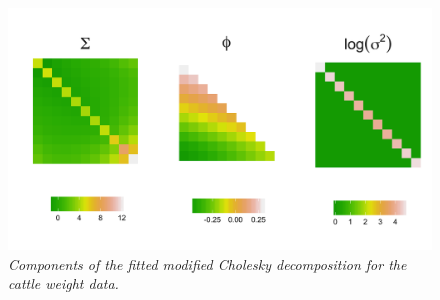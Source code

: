 %

\begin{figure}[H]
  \centering
  \includegraphics[width = \textwidth]{img/chapter-5/cattle-cholesky-estimate-ggplot}
\caption{\textit{Components of the fitted modified Cholesky decomposition for the cattle weight data.}} \label{fig:fitted-cholesky-decomposition-cattle-date}
\end{figure}


